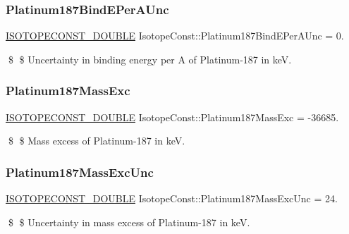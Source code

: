\subsubsection{\texorpdfstring{Platinum187\+Bind\+E\+Per\+A\+Unc}{Platinum187BindEPerAUnc}}
{\footnotesize\ttfamily \mbox{\hyperlink{group___isotope_const-_macros_ga8f45a7272ce02c0b4c65c44636ed719a}{I\+S\+O\+T\+O\+P\+E\+C\+O\+N\+S\+T\+\_\+\+D\+O\+U\+B\+LE}} Isotope\+Const\+::\+Platinum187\+Bind\+E\+Per\+A\+Unc = 0.}

\$ \$ Uncertainty in binding energy per A of Platinum-\/187 in keV. \mbox{\label{group___isotope_const-_platinum-_pt187_ga59b43b92bfb25d0a8be5082fd4e78293}} 
\subsubsection{\texorpdfstring{Platinum187\+Mass\+Exc}{Platinum187MassExc}}
{\footnotesize\ttfamily \mbox{\hyperlink{group___isotope_const-_macros_ga8f45a7272ce02c0b4c65c44636ed719a}{I\+S\+O\+T\+O\+P\+E\+C\+O\+N\+S\+T\+\_\+\+D\+O\+U\+B\+LE}} Isotope\+Const\+::\+Platinum187\+Mass\+Exc = -\/36685.}

\$ \$ Mass excess of Platinum-\/187 in keV. \mbox{\label{group___isotope_const-_platinum-_pt187_ga87cf5393b7182699f6b3337ee816419f}} 
\subsubsection{\texorpdfstring{Platinum187\+Mass\+Exc\+Unc}{Platinum187MassExcUnc}}
{\footnotesize\ttfamily \mbox{\hyperlink{group___isotope_const-_macros_ga8f45a7272ce02c0b4c65c44636ed719a}{I\+S\+O\+T\+O\+P\+E\+C\+O\+N\+S\+T\+\_\+\+D\+O\+U\+B\+LE}} Isotope\+Const\+::\+Platinum187\+Mass\+Exc\+Unc = 24.}

\$ \$ Uncertainty in mass excess of Platinum-\/187 in keV. \mbox{\label{group___isotope_const-_platinum-_pt187_gac27572b3e8251896b954c4789bc686cf}} 
